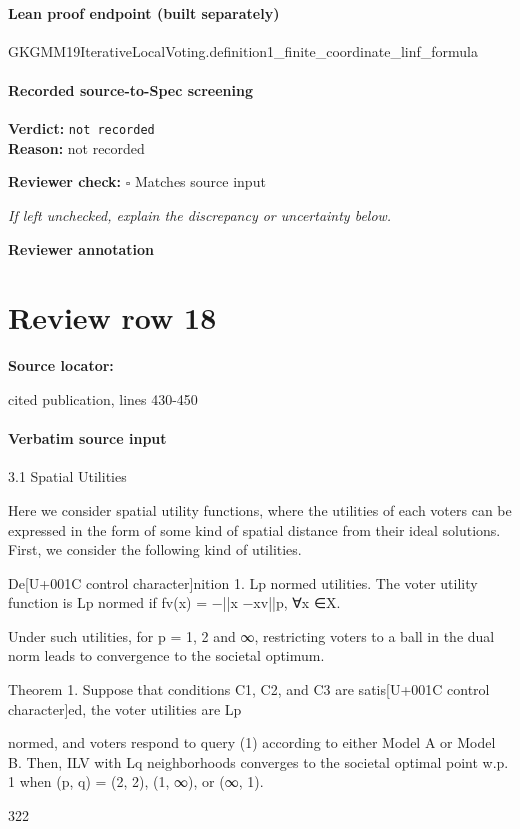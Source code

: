 \documentclass[10pt]{article}
\newcommand{\reviewerbox}{%
  \par\noindent\fbox{\parbox{0.96\linewidth}{\rule{0pt}{0.38in}}}\par
}
\newcommand{\reviewmatch}[1]{%
  \par\noindent\textbf{Reviewer check:} $\square$\; #1\par
  \noindent\emph{If left unchecked, explain the discrepancy or uncertainty below.}\par
}
\begin{document}
\paragraph{Lean proof endpoint (built separately)}\begin{ReviewVerbatim}
GKGMM19IterativeLocalVoting.definition1_finite_coordinate_linf_formula
\end{ReviewVerbatim}

\paragraph{Recorded source-to-Spec screening}
\textbf{Verdict:} \texttt{not recorded}
\\
\textbf{Reason:} not recorded
\reviewmatch{Matches source input}
\noindent\textbf{Reviewer annotation}\par
\reviewerbox
\clearpage
\hypertarget{source-claim-27c15d13368b1478}{}
\section*{Review row 18}
\textbf{Source locator:} {\footnotesize\raggedright cited publication, lines 430-\allowbreak{}450\par}
\paragraph{Verbatim source input}
\begin{ReviewVerbatim}
3.1 Spatial Utilities

Here we consider spatial utility functions, where the utilities of each voters can be expressed
in the form of some kind of spatial distance from their ideal solutions. First, we consider
the following kind of utilities.

De[U+001C control character]nition 1. Lp normed utilities. The voter utility function is Lp normed if fv(x) =
−||x −xv||p, ∀x ∈X.

Under such utilities, for p = 1, 2 and ∞, restricting voters to a ball in the dual norm
leads to convergence to the societal optimum.

Theorem 1. Suppose that conditions C1, C2, and C3 are satis[U+001C control character]ed, the voter utilities are Lp

normed, and voters respond to query (1) according to either Model A or Model B. Then,
ILV with Lq neighborhoods converges to the societal optimal point w.p. 1 when (p, q) = (2, 2),
(1, ∞), or (∞, 1).

322
\end{ReviewVerbatim}
\end{document}
